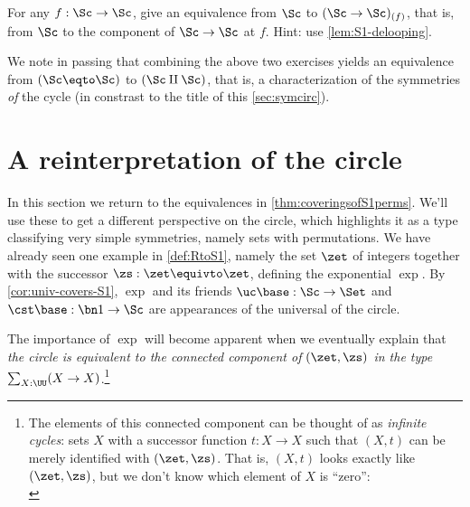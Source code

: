 \begin{xca}\label{xca:(S1->S1)_(f)-eqv-S1}
For any $f: \Sc\to\Sc$, give an equivalence
from $\Sc$ to $(\Sc\to\Sc)_{(f)}$, that is, from $\Sc$ to
the component of $\Sc\to\Sc$ at $f$.
Hint: use \cref{lem:S1-delooping}.
\end{xca}

We note in passing that combining the above two exercises
yields an equivalence from $(\Sc\eqto\Sc)$ to $(\Sc\amalg\Sc)$,
that is, a characterization of the symmetries \emph{of} the cycle
(in constrast to the title of this \cref{sec:symcirc}).


\section{A reinterpretation of the circle}\label{sec:S1isC}

In this section we return to the equivalences in \cref{thm:coveringsofS1perms}.
We'll use these to get a different perspective on the circle,
which highlights it as a type classifying very simple symmetries,
namely sets with permutations.
We have already seen one example in \cref{def:RtoS1},
namely the set $\zet$ of integers together with the successor 
$\zs: \zet\equivto\zet$, defining the exponential \covering $\exp$.
By \cref{cor:univ-covers-S1}, $\exp$ and its friends
$\uc\base:\Sc \to \Set$ and $\cst\base : \bn 1 \to \Sc$
are appearances of the universal \covering of the circle.

The importance of $\exp$ will become apparent when we eventually
explain that \emph{the circle is equivalent to the connected component of
  $(\zet,\zs)$ in the type $\sum_{X:\UU}(X\to X)$}.\footnote{%
  The elements of this connected component can be thought of as
  \emph{infinite cycles}:
  sets $X$ with a successor function $t:X \to X$
  such that $(X,t)$ can be merely identified with $(\zet,\zs)$.
  That is, $(X,t)$ looks exactly like $(\zet,\zs)$,
  but we don't know which element of $X$ is ``zero'':\\[1ex]
  }

